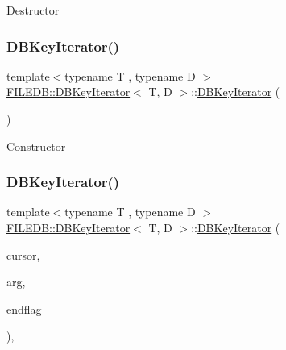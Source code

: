 Destructor \mbox{\label{classFILEDB_1_1DBKeyIterator_aece085c0a59d87759e01613b5c64ef36}} 
\subsubsection{\texorpdfstring{DBKeyIterator()}{DBKeyIterator()}\hspace{0.1cm}{\footnotesize\ttfamily [4/9]}}
{\footnotesize\ttfamily template$<$typename T , typename D $>$ \\
\mbox{\hyperlink{classFILEDB_1_1DBKeyIterator}{F\+I\+L\+E\+D\+B\+::\+D\+B\+Key\+Iterator}}$<$ T, D $>$\+::\mbox{\hyperlink{classFILEDB_1_1DBKeyIterator}{D\+B\+Key\+Iterator}} (\begin{DoxyParamCaption}\item[{void}]{ }\end{DoxyParamCaption})\hspace{0.3cm}{\ttfamily [inline]}}

Constructor \mbox{\label{classFILEDB_1_1DBKeyIterator_a7dc82bdde4a77bcadd704a3e87f6534a}} 
\subsubsection{\texorpdfstring{DBKeyIterator()}{DBKeyIterator()}\hspace{0.1cm}{\footnotesize\ttfamily [5/9]}}
{\footnotesize\ttfamily template$<$typename T , typename D $>$ \\
\mbox{\hyperlink{classFILEDB_1_1DBKeyIterator}{F\+I\+L\+E\+D\+B\+::\+D\+B\+Key\+Iterator}}$<$ T, D $>$\+::\mbox{\hyperlink{classFILEDB_1_1DBKeyIterator}{D\+B\+Key\+Iterator}} (\begin{DoxyParamCaption}\item[{const \mbox{\hyperlink{classFILEDB_1_1DBCursor}{D\+B\+Cursor}} \&}]{cursor,  }\item[{const T \&}]{arg,  }\item[{int}]{endflag }\end{DoxyParamCaption})\hspace{0.3cm}{\ttfamily [inline]}, {\ttfamily [explicit]}}

